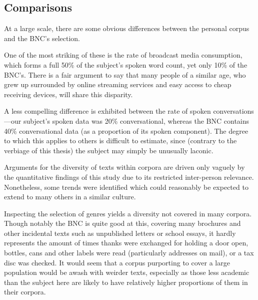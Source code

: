 







\subsection{Comparisons}



At a large scale, there are some obvious differences between the personal corpus and the BNC's selection.

One of the most striking of these is the rate of broadcast media consumption, which forms a full 50\% of the subject's spoken word count, yet only 10\% of the BNC's.  There is a fair argument to say that many people of a similar age, who grew up surrounded by online streaming services and easy access to cheap receiving devices, will share this disparity.

A less compelling difference is exhibited between the rate of spoken conversations---our subject's spoken data was 20\% conversational, whereas the BNC contains 40\% conversational data (as a proportion of its spoken component).  The degree to which this applies to others is difficult to estimate, since (contrary to the verbiage of this thesis) the subject may simply be unusually laconic.



Arguments for the diversity of texts within corpora are driven only vaguely by the quantitative findings of this study due to its restricted inter-person relevance.  Nonetheless, some trends were identified which could reasonably be expected to extend to many others in a similar culture.

Inspecting the selection of genres yields a diversity not covered in many corpora.  Though notably the BNC is quite good at this, covering many brochures and other incidental texts such as unpublished letters or school essays, it hardly represents the amount of times thanks were exchanged for holding a door open, bottles, cans and other labels were read (particularly addresses on mail), or a tax disc was checked.  It would seem that a corpus purporting to cover a large population would be awash with weirder texts, especially as those less academic than the subject here are likely to have relatively higher proportions of them in their corpora.

